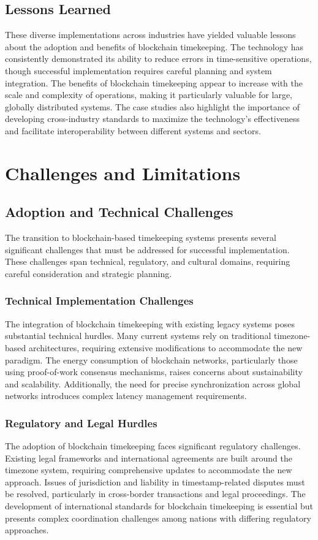\documentclass[12pt]{report}
\begin{document}
\section{Lessons Learned}
These diverse implementations across industries have yielded valuable lessons about the adoption and benefits of blockchain timekeeping. The technology has consistently demonstrated its ability to reduce errors in time-sensitive operations, though successful implementation requires careful planning and system integration. The benefits of blockchain timekeeping appear to increase with the scale and complexity of operations, making it particularly valuable for large, globally distributed systems. The case studies also highlight the importance of developing cross-industry standards to maximize the technology's effectiveness and facilitate interoperability between different systems and sectors.

\chapter{Challenges and Limitations}

\section{Adoption and Technical Challenges}
The transition to blockchain-based timekeeping systems presents several significant challenges that must be addressed for successful implementation. These challenges span technical, regulatory, and cultural domains, requiring careful consideration and strategic planning.

\subsection{Technical Implementation Challenges}
The integration of blockchain timekeeping with existing legacy systems poses substantial technical hurdles. Many current systems rely on traditional timezone-based architectures, requiring extensive modifications to accommodate the new paradigm. The energy consumption of blockchain networks, particularly those using proof-of-work consensus mechanisms, raises concerns about sustainability and scalability. Additionally, the need for precise synchronization across global networks introduces complex latency management requirements.

\subsection{Regulatory and Legal Hurdles}
The adoption of blockchain timekeeping faces significant regulatory challenges. Existing legal frameworks and international agreements are built around the timezone system, requiring comprehensive updates to accommodate the new approach. Issues of jurisdiction and liability in timestamp-related disputes must be resolved, particularly in cross-border transactions and legal proceedings. The development of international standards for blockchain timekeeping is essential but presents complex coordination challenges among nations with differing regulatory approaches.
\end{document}
